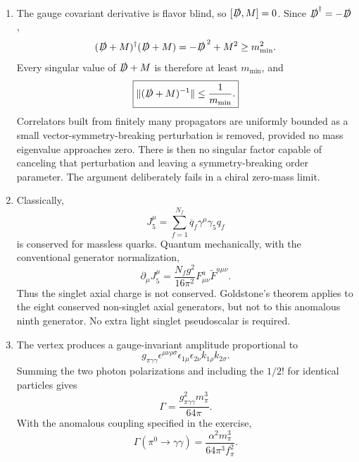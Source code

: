 \begin{enumerate}
  \begin{enumerate}
    \item[(a)]
    The gauge covariant derivative is flavor blind, so \([\slashed D,M]=0\).
    Since \(\slashed D^\dagger=-\slashed D\),
    \[
      (\slashed D+M)^\dagger(\slashed D+M)
        =-\slashed D^{\,2}+M^2\geq m_{\min}^2.
    \]
    Every singular value of \(\slashed D+M\) is therefore at least
    \(m_{\min}\), and
    \[
      \boxed{\|(\slashed D+M)^{-1}\|\leq\frac1{m_{\min}}.}
    \]
    Correlators built from finitely many propagators are uniformly bounded
    as a small vector-symmetry-breaking perturbation is removed, provided
    no mass eigenvalue approaches zero.  There is then no singular factor
    capable of canceling that perturbation and leaving a symmetry-breaking
    order parameter.  The argument deliberately fails in a chiral
    zero-mass limit.
    \item[(b)]
    Classically,
    \[
      J^\mu_5=\sum_{f=1}^{N_f}\overline q_f\gamma^\mu\gamma_5q_f
    \]
    is conserved for massless quarks.  Quantum mechanically, with the
    conventional generator normalization,
    \[
      \boxed{\partial_\mu J^\mu_5
        =\frac{N_fg^2}{16\pi^2}
         F^a_{\mu\nu}\widetilde F^{a\mu\nu}.}
    \]
    Thus the singlet axial charge is not conserved.  Goldstone's theorem
    applies to the eight conserved non-singlet axial generators, but not to
    this anomalous ninth generator.  No extra light singlet pseudoscalar is
    required.
    \item[(c)]
    The vertex produces a gauge-invariant amplitude proportional to
    \[
      g_{\pi\gamma\gamma}
        \epsilon^{\mu\nu\rho\sigma}
        \epsilon_{1\mu}\epsilon_{2\nu}k_{1\rho}k_{2\sigma}.
    \]
    Summing the two photon polarizations and including the \(1/2!\) for
    identical particles gives
    \[
      \Gamma=\frac{g_{\pi\gamma\gamma}^2m_\pi^3}{64\pi}.
    \]
    With the anomalous coupling specified in the exercise,
    \[
      \boxed{\Gamma(\pi^0\to\gamma\gamma)
        =\frac{\alpha^2m_\pi^3}{64\pi^3f_\pi^2}.}
    \]
  \end{enumerate}


\end{enumerate}
